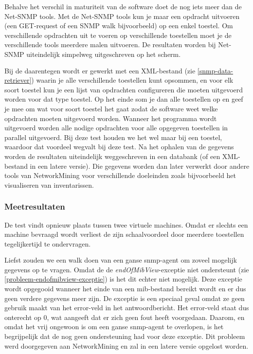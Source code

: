 Behalve het verschil in maturiteit van de software doet de \nwmretriever{} nog iets meer dan de Net-SNMP tools.
Met de Net-SNMP tools kun je maar een opdracht uitvoeren (een GET-request of een SNMP walk bijvoorbeeld) op een enkel toestel.
Om verschillende opdrachten uit te voeren op verschillende toestellen moet je de verschillende tools meerdere malen uitvoeren.
De resultaten worden bij Net-SNMP uiteindelijk simpelweg uitgeschreven op het scherm.

Bij de \nwmretriever{} daarentegen wordt er gewerkt met een XML-bestand (zie \cref{snmp-data-retriever}) waarin je alle verschillende toestellen kunt opsommen,
en voor elk soort toestel kun je een lijst van opdrachten configureren die moeten uitgevoerd worden voor dat type toestel.
Op het einde som je dan alle toestellen op en geef je mee om wat voor soort toestel het gaat zodat de software weet welke opdrachten moeten uitgevoerd worden.
Wanneer het programma wordt uitgevoerd worden alle nodige opdrachten voor alle opgegeven toestellen in parallel uitgevoerd.
Bij deze test houden we het wel maar bij een toestel, waardoor dat voordeel wegvalt bij deze test.
Na het ophalen van de gegevens worden de resultaten uiteindelijk weggeschreven in een databank (of een XML-bestand in een latere versie).
Die gegevens worden dan later verwerkt door andere tools van NetworkMining voor verschillende doeleinden zoals bijvoorbeeld het visualiseren van inventarissen.

\subsubsection{Meetresultaten}

De test vindt opnieuw plaats tussen twee virtuele machines.
Omdat er slechts een machine bevraagd wordt verliest de \nwmretriever{} zijn schaalvoordeel door meerdere toestellen tegelijkertijd te ondervragen.

Liefst zouden we een walk doen van een ganse \gls{snmp-agent} om zoveel mogelijk gegevens op te vragen.
Omdat de \nwmretriever{} de \textit{endOfMibView}-exceptie niet ondersteunt (zie \cref{probleem-endofmibview-exceptie}) is het dit echter niet mogelijk.
Deze exceptie wordt opgegooid wanneer het einde van een \gls{mib}-bestand bereikt wordt en er dus geen verdere gegevens meer zijn.
De exceptie is een speciaal geval omdat ze geen gebruik maakt van het error-veld in het antwoordbericht.
Het error-veld staat dus onterecht op 0, wat aangeeft dat er zich geen fout heeft voorgedaan.
Daarom, en omdat het vrij ongewoon is om een ganse \gls{snmp-agent} te overlopen, is het begrijpelijk dat de \nwmretriever{} nog geen ondersteuning had voor deze exceptie.
Dit probleem werd doorgegeven aan NetworkMining en zal in een latere versie opgelost worden.

